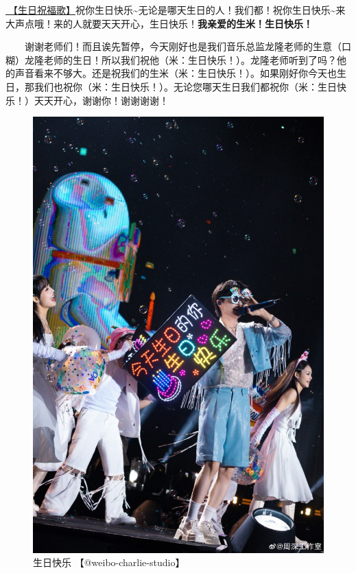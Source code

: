 \documentclass[]{ctexbook}
\begin{document}
\hyperref[happy-birthday]{🎵【生日祝福歌】}祝你生日快乐\textasciitilde 无论是哪天生日的人！我们都！祝你生日快乐\textasciitilde 来大声点哦！来的人就要天天开心，生日快乐！\textbf{我亲爱的生米！生日快乐！}

  谢谢老师们！而且诶先暂停，今天刚好也是我们音乐总监龙隆老师的生意（口糊）龙隆老师的生日！所以我们祝他（米：生日快乐！）。龙隆老师听到了吗？他的声音看来不够大。还是祝我们的生米（米：生日快乐！）。如果刚好你今天也生日，那我们也祝你（米：生日快乐！）。无论您哪天生日我们都祝你（米：生日快乐！）天天开心，谢谢你！谢谢谢谢！

\begin{figure}

{\centering \includegraphics[width=400pt]{img/wuhan20240727/001} 

}

\caption{生日快乐 【@weibo-charlie-studio】}\label{fig:unnamed-chunk-66}
\end{figure}
\end{document}
